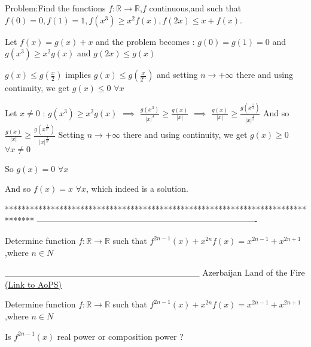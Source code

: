 \begin{solution}
	\begin{tcolorbox}Problem:Find the functions $f: \mathbb{R}\to\mathbb{R}$,$f$ continuous,and such that
$f(0)=0,f(1)=1,f(x^3){\ge}x^2f(x),f(2x){\leq}x+f(x)$.\end{tcolorbox}
Let $f(x)=g(x)+x$ and the problem becomes : $g(0)=g(1)=0$ and $g(x^3)\ge x^2g(x)$ and $g(2x)\le g(x)$

$g(x)\le g(\frac x2)$ implies $g(x)\le g(\frac x{2^n})$ and setting $n\to +\infty$ there and using continuity, we get $g(x)\le 0$ $\forall x$

Let $x\ne 0$ : $g(x^3)\ge x^2g(x)$ $\implies$ $\frac{g(x^3)}{|x|^3}\ge \frac{g(x)}{|x|}$ $\implies$ $\frac{g(x)}{|x|}\ge \frac{g(x^{\frac 13})}{|x|^{\frac 13}}$
And so $\frac{g(x)}{|x|}\ge \frac{g(x^{\frac 1{3^n}})}{|x|^{\frac 1{3^n}}}$
Setting $n\to +\infty$ there and using continuity, we get $g(x)\ge 0$ $\forall x\ne 0$

So $g(x)=0$ $\forall x$ 

And so $\boxed{f(x)=x}$ $\forall x$, which indeed is a solution.
\end{solution}
*******************************************************************************
-------------------------------------------------------------------------------

\begin{problem}
	Determine function $f: \mathbb{R}\to\mathbb{R}$ such that $f^{2n-1}(x)+x^{2n}f(x)=x^{2n-1}+x^{2n+1}$,where $n\in{N}$



_______________________________
Azerbaijan Land of the Fire 
	\flushright \href{https://artofproblemsolving.com/community/c6h477434}{(Link to AoPS)}
\end{problem}



\begin{solution}
	\begin{tcolorbox}Determine function $f: \mathbb{R}\to\mathbb{R}$ such that $f^{2n-1}(x)+x^{2n}f(x)=x^{2n-1}+x^{2n+1}$,where $n\in{N}$\end{tcolorbox}
Is  $f^{2n-1}(x)$ real power or composition power ?
\end{solution}



